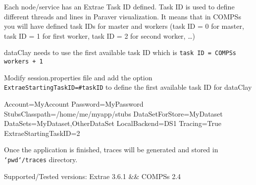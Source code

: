 Each node/service has an Extrae Task ID defined. Task ID is used to define different threads and lines in Paraver visualization. It means that in COMPSs you will have defined task IDs for master and workers (task ID = 0 for master, task ID = 1 for first worker, task ID = 2 for second worker, \ldots)

dataClay needs to use the first available task ID which is \texttt{task ID = COMPSs workers + 1}

Modify session.properties file and add the option \texttt{ExtraeStartingTaskID=#taskID} to define the first available task ID for dataClay

\begin{tBox}
 \begin{bash}
  Account=MyAccount
  Password=MyPassword
  StubsClasspath=/home/me/myapp/stubs
  DataSetForStore=MyDataset
  DataSets=MyDataset,OtherDataSet
  LocalBackend=DS1
  Tracing=True
  ExtraeStartingTaskID=2
 \end{bash}
\end{tBox}

Once the application is finished, traces will be generated and stored in \texttt{`pwd`/traces} directory. 

Supported/Tested versions: Extrae 3.6.1 && COMPSs 2.4

